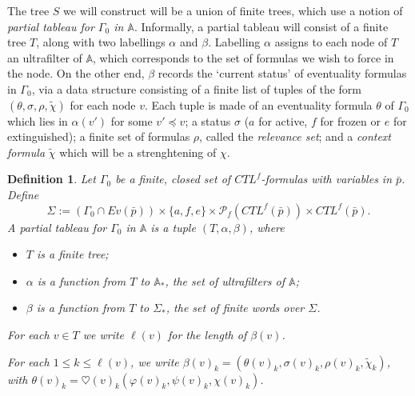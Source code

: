\documentclass[11pt]{article}
\newcommand{\A}{{\mathbb A}}
\newcommand{\Evp}{{Ev(\bar{p})}}
\newtheorem{definition}{Definition}[section]
\begin{document}
The tree $S$ we will construct will be a union of finite trees, which use a notion of \emph{partial tableau for $\Gamma_0$ in $\A$}. Informally, a partial tableau will consist of a finite tree $T$, along with two labellings $\alpha$ and $\beta$. Labelling $\alpha$ assigns to each node of $T$ an ultrafilter of $\A$, which corresponds to the set of formulas we wish to force in the node. On the other end, $\beta$ records the `current status' of eventuality formulas in $\Gamma_0$, via a data structure consisting of a finite list of tuples of the form $(\theta,\sigma,\rho,\tilde{\chi})$ for each node $v$. Each tuple is made of an eventuality formula $\theta$ of $\Gamma_0$ which lies in $\alpha(v')$ for some $v'\preceq v$; a status $\sigma$ ($a$ for active, $f$ for frozen or $e$ for extinguished); a finite set of formulas $\rho$, called the \emph{relevance set}; and a \emph{context formula} $\tilde{\chi}$ which will be a strenghtening of $\chi$.

\begin{definition}\label{partial_tableau}
    Let $\Gamma_0$ be a finite, closed set of $CTL^f$-formulas with variables in $\bar{p}$. Define \[\Sigma:=(\Gamma_0\cap\Evp)\times\{a,f,e\}\times\mathcal{P}_f(CTL^f(\bar{p}))\times CTL^f(\bar{p}).\] A \emph{partial tableau for $\Gamma_0$ in $\A$} is a tuple $(T,\alpha,\beta)$, where
    \begin{itemize}
        \setlength\itemsep{0em}
        \item $T$ is a finite tree;
        \item $\alpha$ is a function from $T$ to $\A_*$, the set of ultrafilters of $\A$;
        \item $\beta$ is a function from $T$ to $\Sigma_*$, the set of finite words over $\Sigma$.
    \end{itemize}

    For each $v\in T$ we write $\ell(v)$ for the length of $\beta(v)$. 
    
    For each $1\leq k\leq \ell(v)$, we write $\beta(v)_k=(\theta(v)_k,\sigma(v)_k,\rho(v)_k,\tilde{\chi}_k)$, with $\theta(v)_k=\heartsuit(v)_k(\varphi(v)_k,\psi(v)_k,\chi(v)_k)$.
\end{definition}
\end{document}
